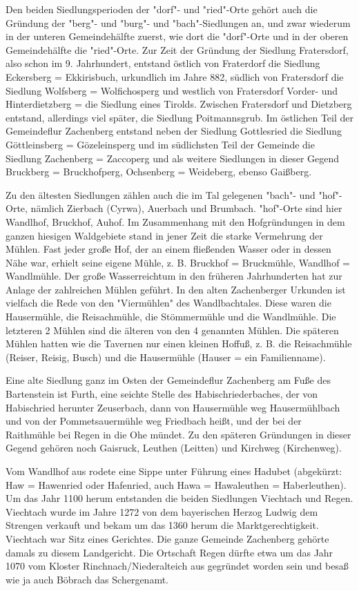 Den beiden Siedlungsperioden der "dorf"- und "ried"-Orte gehört auch die
Gründung der "berg"- und "burg"- und "bach"-Siedlungen an, und zwar wiederum in
der unteren Gemeindehälfte zuerst, wie dort die "dorf"-Orte und in der oberen
Gemeindehälfte die "ried"-Orte. Zur Zeit der Gründung der Siedlung Fratersdorf,
also schon im 9. Jahrhundert, entstand östlich von Fraterdorf die Siedlung
Eckersberg = Ekkirisbuch, urkundlich im Jahre 882, südlich von Fratersdorf die
Siedlung Wolfsberg = Wolfichosperg und westlich von Fratersdorf Vorder- und
Hinterdietzberg = die Siedlung eines Tirolds. Zwischen Fratersdorf und Dietzberg
entstand, allerdings viel später, die Siedlung Poitmannsgrub. Im östlichen Teil
der Gemeindeflur Zachenberg entstand neben der Siedlung Gottlesried die Siedlung
Göttleinsberg = Gözeleinsperg und im südlichsten Teil der Gemeinde die Siedlung
Zachenberg = Zaccoperg und als weitere Siedlungen in dieser Gegend Bruckberg =
Bruckhofperg, Ochsenberg = Weideberg, ebenso Gaißberg.

Zu den ältesten Siedlungen zählen auch die im Tal gelegenen "bach"- und
"hof"-Orte, nämlich Zierbach (Cyrwa), Auerbach und Brumbach. "hof"-Orte sind
hier Wandlhof, Bruckhof, Auhof. Im Zusammenhang mit den Hofgründungen in dem
ganzen hiesigen Waldgebiete stand in jener Zeit die starke Vermehrung der
Mühlen. Fast jeder große Hof, der an einem fließenden Wasser oder in dessen Nähe
war, erhielt seine eigene Mühle, z. B. Bruckhof = Bruckmühle, Wandlhof =
Wandlmühle. Der große Wasserreichtum in den früheren Jahrhunderten hat zur
Anlage der zahlreichen Mühlen geführt. In den alten Zachenberger Urkunden ist
vielfach die Rede von den "Viermühlen" des Wandlbachtales. Diese waren die
Hausermühle, die Reisachmühle, die Stömmermühle und die Wandlmühle. Die
letzteren 2 Mühlen sind die älteren von den 4 genannten Mühlen. Die späteren
Mühlen hatten wie die Tavernen nur einen kleinen Hoffuß, z. B. die Reisachmühle
(Reiser, Reisig, Busch) und die Hausermühle (Hauser = ein Familienname).

Eine alte Siedlung ganz im Osten der Gemeindeflur Zachenberg am Fuße des
Bartenstein ist Furth, eine seichte Stelle des Habischriederbaches, der von
Habischried herunter Zeuserbach, dann von Hausermühle weg Hausermühlbach und von
der Pommetsauermühle weg Friedbach heißt, und der bei der Raithmühle bei Regen
in die Ohe mündet. Zu den späteren Gründungen in dieser Gegend gehören noch
Gaisruck, Leuthen (Leitten) und Kirchweg (Kirchenweg).

Vom Wandlhof aus rodete eine Sippe unter Führung eines Hadubet (abgekürzt: Haw =
Hawenried oder Hafenried, auch Hawa = Hawaleuthen = Haberleuthen). Um das Jahr
1100 herum entstanden die beiden Siedlungen Viechtach und Regen. Viechtach wurde
im Jahre 1272 von dem bayerischen Herzog Ludwig dem Strengen verkauft und bekam
um das 1360 herum die Marktgerechtigkeit. Viechtach war Sitz eines Gerichtes.
Die ganze Gemeinde Zachenberg gehörte damals zu diesem Landgericht. Die
Ortschaft Regen dürfte etwa um das Jahr 1070 vom Kloster Rinchnach/Niederalteich
aus gegründet worden sein und besaß wie ja auch Böbrach das Schergenamt.

